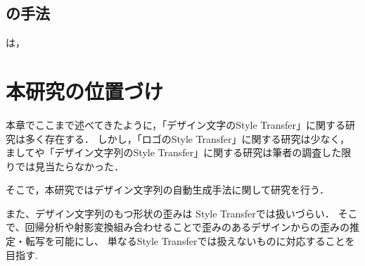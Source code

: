 \documentclass[\homedir/main.tex]{subfiles}
\begin{document}
\subsection{の手法}
\citeauthor{oai:irdb.nii.ac.jp:01211:0005350653}\cite{oai:irdb.nii.ac.jp:01211:0005350653}は，

\section{本研究の位置づけ}\label{sec:positioning}%
本章でここまで述べてきたように，「デザイン文字のStyle Transfer」に関する研究は多く存在する．
しかし，「ロゴのStyle Transfer」に関する研究は少なく，
ましてや「デザイン文字列のStyle Transfer」に関する研究は筆者の調査した限りでは見当たらなかった．

そこで，本研究ではデザイン文字列の自動生成手法に関して研究を行う．

また、デザイン文字列のもつ形状の歪みは
Style Transferでは扱いづらい．
そこで、回帰分析や射影変換組み合わせることで歪みのあるデザインからの歪みの推定・転写を可能にし、
単なるStyle Transferでは扱えないものに対応することを目指す.

\printBibForSubfiles
\end{document}
